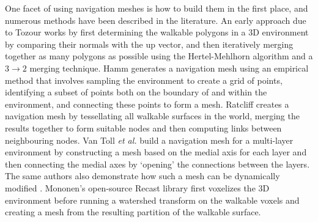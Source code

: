 \documentclass[10pt,twocolumn]{article}
\begin{document}
One facet of using navigation meshes is how to build them in the first place, and numerous methods have been described in the literature. An early approach due to Tozour \cite{tozour02} works by first determining the walkable polygons in a 3D environment by comparing their normals with the up vector, and then iteratively merging together as many polygons as possible using the Hertel-Mehlhorn algorithm \cite{hertel83,orourke94} and a $3 \rightarrow 2$ merging technique. Hamm \cite{hamm08} generates a navigation mesh using an empirical method that involves sampling the environment to create a grid of points, identifying a subset of points both on the boundary of and within the environment, and connecting these points to form a mesh. Ratcliff \cite{ratcliff08} creates a navigation mesh by tessellating all walkable surfaces in the world, merging the results together to form suitable nodes and then computing links between neighbouring nodes. Van Toll \emph{et al.} \cite{vantoll11} build a navigation mesh for a multi-layer environment by constructing a mesh based on the medial axis for each layer and then connecting the medial axes by `opening' the connections between the layers. The same authors also demonstrate how such a mesh can be dynamically modified \cite{vantoll12}. Mononen's open-source Recast library \cite{mononen09} first voxelizes the 3D environment before running a watershed transform \cite{beucher90,gonzalez02} on the walkable voxels and creating a mesh from the resulting partition of the walkable surface.

\end{document}
